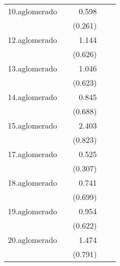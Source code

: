 {\begin{longtable}{l*{4}{D{.}{.}{-1}}}
\addlinespace
10.aglomerado&                     &       0.598\sym{*}  &                     &                     \\
            &                     &     (0.261)         &                     &                     \\
\addlinespace
12.aglomerado&                     &       1.144         &                     &                     \\
            &                     &     (0.626)         &                     &                     \\
\addlinespace
13.aglomerado&                     &       1.046         &                     &                     \\
            &                     &     (0.623)         &                     &                     \\
\addlinespace
14.aglomerado&                     &       0.845         &                     &                     \\
            &                     &     (0.688)         &                     &                     \\
\addlinespace
15.aglomerado&                     &       2.403\sym{**} &                     &                     \\
            &                     &     (0.823)         &                     &                     \\
\addlinespace
17.aglomerado&                     &       0.525         &                     &                     \\
            &                     &     (0.307)         &                     &                     \\
\addlinespace
18.aglomerado&                     &       0.741         &                     &                     \\
            &                     &     (0.699)         &                     &                     \\
\addlinespace
19.aglomerado&                     &       0.954         &                     &                     \\
            &                     &     (0.622)         &                     &                     \\
\addlinespace
20.aglomerado&                     &       1.474         &                     &                     \\
            &                     &     (0.791)         &                     &                     \\

\end{longtable}}

